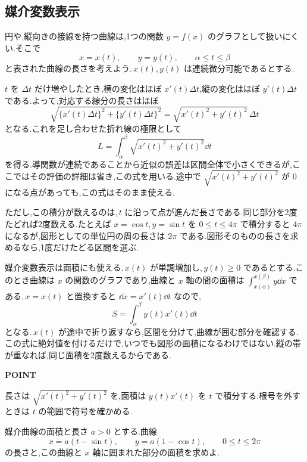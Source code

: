 \subsection{媒介変数表示}

円や,縦向きの接線を持つ曲線は,1つの関数 $y=f(x)$ のグラフとして扱いにくい.そこで
\[
x=x(t),\qquad y=y(t),\qquad \alpha\le t\le\beta
\]
と表された曲線の長さを考えよう.\,$x(t),y(t)$ は連続微分可能であるとする.

$t$ を $\Delta t$ だけ増やしたとき,横の変化はほぼ $x'(t)\Delta t$,縦の変化はほぼ $y'(t)\Delta t$ である.よって,対応する線分の長さはほぼ
\[
\sqrt{\{x'(t)\Delta t\}^2+\{y'(t)\Delta t\}^2}
 =\sqrt{x'(t)^2+y'(t)^2}\,\Delta t
\]
となる.これを足し合わせた折れ線の極限として
\begin{equation}\label{式:媒介曲線の弧長}
L=\int_\alpha^\beta\sqrt{x'(t)^2+y'(t)^2}\dd t
\end{equation}
を得る.導関数が連続であることから近似の誤差は区間全体で小さくできるが,ここではその評価の詳細は省き,この式を用いる.途中で $\sqrt{x'(t)^2+y'(t)^2}$ が $0$ になる点があっても,この式はそのまま使える.

ただし,この積分が数えるのは,\,$t$ に沿って点が進んだ長さである.同じ部分を2度たどれば2度数える.たとえば $x=\cos t$,\,$y=\sin t$ を $0\le t\le4\pi$ で積分すると $4\pi$ になるが,図形としての単位円の周の長さは $2\pi$ である.図形そのものの長さを求めるなら,1度だけたどる区間を選ぶ.

媒介変数表示は面積にも使える.\,$x(t)$ が単調増加し,\,$y(t)\ge0$ であるとする.このとき曲線は $x$ の関数のグラフであり,曲線と $x$ 軸の間の面積は $\int_{x(\alpha)}^{x(\beta)}y\dd x$ である.\,$x=x(t)$ と置換すると $\dd x=x'(t)\dd t$ なので,
\begin{equation}\label{式:媒介曲線の面積}
S=\int_\alpha^\beta y(t)x'(t)\dd t
\end{equation}
となる.\,$x(t)$ が途中で折り返すなら,区間を分けて,曲線が囲む部分を確認する.この式に絶対値を付けるだけで,いつでも図形の面積になるわけではない.縦の帯が重なれば,同じ面積を2度数えるからである.

\begin{bookpoint}
\textbf{POINT}\par
長さは $\sqrt{x'(t)^2+y'(t)^2}$ を,面積は $y(t)x'(t)$ を $t$ で積分する.根号を外すときは $t$ の範囲で符号を確かめる.
\end{bookpoint}

\begin{example}{媒介曲線の面積と長さ}
$a>0$ とする.曲線
\[
x=a(t-\sin t),\qquad y=a(1-\cos t),\qquad 0\le t\le2\pi
\]
の長さと,この曲線と $x$ 軸に囲まれた部分の面積を求めよ.
\end{example}

